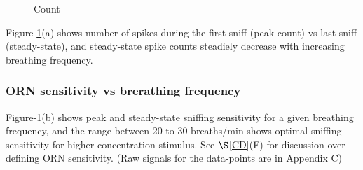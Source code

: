 \documentclass[
]{article}
\begin{document}
\begin{figure}

{\centering {}

}

\caption{Count}\label{fig:rSen}
\end{figure}

Figure-\ref{fig:rSen}(a) shows number of spikes during the first-sniff (peak-count) vs last-sniff (steady-state), and steady-state spike counts steadiely decrease with increasing breathing frequency.

\hypertarget{orn-sensitivity-vs-brerathing-frequency}{%
\subsubsection{ORN sensitivity vs brerathing frequency}\label{orn-sensitivity-vs-brerathing-frequency}}

Figure-\ref{fig:rSen}(b) shows peak and steady-state sniffing sensitivity for a given breathing frequency, and the range between 20 to 30 breaths/min shows optimal sniffing sensitivity for higher concentration stimulus. See \(\S\)\ref{CD}(F) for discussion over defining ORN sensitivity. (Raw signals for the data-points are in Appendix C)
\end{document}
